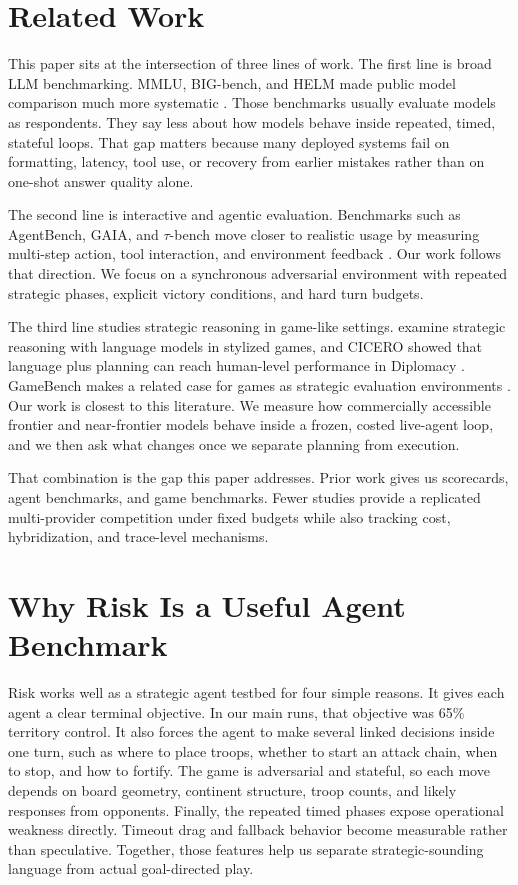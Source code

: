 \documentclass[11pt]{article}
\begin{document}
\section{Related Work}

This paper sits at the intersection of three lines of work. The first line is broad LLM benchmarking. MMLU, BIG-bench, and HELM made public model comparison much more systematic \citep{hendrycks2020mmlu,srivastava2022bigbench,liang2022helm}. Those benchmarks usually evaluate models as respondents. They say less about how models behave inside repeated, timed, stateful loops. That gap matters because many deployed systems fail on formatting, latency, tool use, or recovery from earlier mistakes rather than on one-shot answer quality alone.

The second line is interactive and agentic evaluation. Benchmarks such as AgentBench, GAIA, and $\tau$-bench move closer to realistic usage by measuring multi-step action, tool interaction, and environment feedback \citep{liu2023agentbench,mialon2023gaia,yao2024taubench}. Our work follows that direction. We focus on a synchronous adversarial environment with repeated strategic phases, explicit victory conditions, and hard turn budgets.

The third line studies strategic reasoning in game-like settings. \citet{gandhi2023strategic} examine strategic reasoning with language models in stylized games, and CICERO showed that language plus planning can reach human-level performance in Diplomacy \citep{bakhtin2022diplomacy}. GameBench makes a related case for games as strategic evaluation environments \citep{costarelli2024gamebench}. Our work is closest to this literature. We measure how commercially accessible frontier and near-frontier models behave inside a frozen, costed live-agent loop, and we then ask what changes once we separate planning from execution.

That combination is the gap this paper addresses. Prior work gives us scorecards, agent benchmarks, and game benchmarks. Fewer studies provide a replicated multi-provider competition under fixed budgets while also tracking cost, hybridization, and trace-level mechanisms.

\section{Why Risk Is a Useful Agent Benchmark}

Risk works well as a strategic agent testbed for four simple reasons. It gives each agent a clear terminal objective. In our main runs, that objective was 65\% territory control. It also forces the agent to make several linked decisions inside one turn, such as where to place troops, whether to start an attack chain, when to stop, and how to fortify. The game is adversarial and stateful, so each move depends on board geometry, continent structure, troop counts, and likely responses from opponents. Finally, the repeated timed phases expose operational weakness directly. Timeout drag and fallback behavior become measurable rather than speculative. Together, those features help us separate strategic-sounding language from actual goal-directed play.
\end{document}
